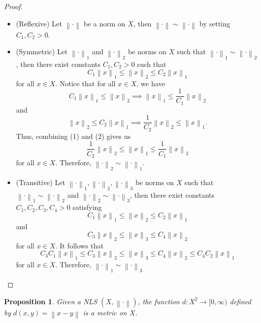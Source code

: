 \documentclass{article}
\newtheorem*{proposition}{Proposition}
\newcommand{\lnorm}[2]{\left\lVert#2 \right\rVert_{#1}}
\newcommand{\norm}[1]{\left\lVert#1 \right\rVert}
\begin{document}
\begin{proof} \leavevmode
    \begin{itemize}
        \item (Reflexive) Let $\norm{\cdot}$ be a norm on $X$, then $\norm{\cdot} \sim \norm{\cdot}$ by setting $C_1, C_2 > 0$.
        \item (Symmetric) Let $\lnorm{1}{\cdot}$ and $\lnorm{2}{\cdot}$ be norms on $X$ such that $\lnorm{1}{\cdot} \sim \lnorm{2}{\cdot}$, then there exist constants $C_1, C_2 > 0$ such that 
        $$C_1 \lnorm{1}{x} \leq \lnorm{2}{x} \leq C_2 \lnorm{1}{x}$$
        for all $x \in X$. Notice that for all $x \in X$, we have
        \[C_1 \lnorm{1}{x} \leq \lnorm{2}{x} \implies \lnorm{1}{x} \leq \frac{1}{C_1}\lnorm{2}{x} \tag*{(1)} \]
        and 
        \[\lnorm{2}{x} \leq C_2 \lnorm{1}{x} \implies \frac{1}{C_2}\lnorm{2}{x} \leq \lnorm{1}{x}.\tag*{(2)} \]
        Thus, combining (1) and (2) gives us
        $$\frac{1}{C_2}\lnorm{2}{x} \leq \lnorm{1}{x} \leq \frac{1}{C_1}\lnorm{2}{x}$$
        for all $x \in X$. Therefore, $\lnorm{2}{\cdot} \sim \lnorm{1}{\cdot}$.
        \item (Transitive) Let $\lnorm{1}{\cdot}, \lnorm{2}{\cdot}, \lnorm{3}{\cdot}$ be norms on $X$ such that $\lnorm{1}{\cdot} \sim \lnorm{2}{\cdot}$ and $\lnorm{2}{\cdot} \sim \lnorm{3}{\cdot}$, then there exist constants $C_1, C_2, C_3, C_4 > 0$ satisfying
        $$C_1 \lnorm{1}{x} \leq \lnorm{2}{x} \leq C_2 \lnorm{1}{x}$$
        and 
        $$C_3 \lnorm{2}{x} \leq \lnorm{3}{x} \leq C_4 \lnorm{2}{x}$$
        for all $x \in X$. It follows that
        $$C_3 C_1 \lnorm{1}{x} \leq C_3 \lnorm{2}{x} \leq \lnorm{3}{x} \leq C_4 \lnorm{2}{x} \leq C_4 C_2 \lnorm{1}{x}$$
        for all $x \in X$. Therefore, $\lnorm{1}{\cdot} \sim \lnorm{3}{\cdot}$
    \end{itemize}
\end{proof}

\begin{proposition}
    Given a NLS $(X, \norm{\cdot})$, the function $d : X^2 \to [0, \infty)$ defined by $d(x,y) = \norm{x - y}$ is a metric on $X$.
\end{proposition}
\end{document}
